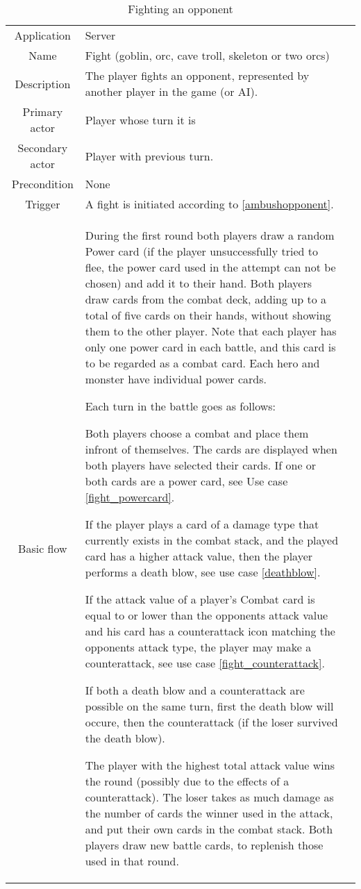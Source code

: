\documentclass[a4paper,10pt]{report}
\begin{document}
\begin{table}
\caption{Fighting an opponent}
\label{fightopponent}
\begin{tabular}{|c| p{9cm}|c}
\hline
Application & Server & \\
Name & Fight (goblin, orc, cave troll, skeleton or two orcs) & \\
Description & The player fights an opponent, represented by another player in the game (or AI). & \\
Primary actor & Player whose turn it is & \\
Secondary actor & Player with previous turn. & \\
Precondition & None & \\
Trigger & A fight is initiated according to \ref{ambushopponent}. & \\ \hline
Basic flow & During the first round both players draw a random Power card (if the player unsuccessfully tried to flee, the power card used in the attempt can not be chosen) and add it to their hand. Both players draw cards from the combat deck, adding up to a total of five cards on their hands, without showing them to the other player. Note that each player has only one power card in each battle, and this card is to be regarded as a combat card. Each hero and monster have individual power cards.

Each turn in the battle goes as follows:

Both players choose a combat and place them infront of themselves. The cards are displayed when both players have selected their cards. If one or both cards are a power card, see Use case \ref{fight_powercard}.

If the player plays a card of a damage type that currently exists in the combat stack, and the played card has a higher attack value, then the player performs a death blow, see use case \ref{deathblow}.

If the attack value of a player's Combat card is equal to or lower than the opponents attack value and his card has a counterattack icon matching the opponents attack type, the player may make a counterattack, see use case \ref{fight_counterattack}.

If both a death blow and a counterattack are possible on the same turn, first the death blow will occure, then the counterattack (if the loser survived the death blow).

The player with the highest total attack value wins the round (possibly due to the effects of a counterattack). The loser takes as much damage as the number of cards the winner used in the attack, and put their own cards in the combat stack. Both players draw new battle cards, to replenish those used in that round.


\end{tabular}
\end{table}
\end{document}
